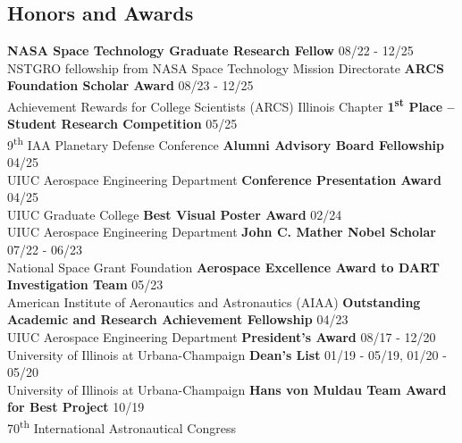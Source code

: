 \documentclass[margin,line]{res}
\newlength{\myitemspacing}
\begin{document}
\begin{resume}
\section{\sc Honors and Awards}
{\bf NASA Space Technology Graduate Research Fellow} \hfill 08/22  - 12/25\\
NSTGRO fellowship from NASA Space Technology Mission Directorate
\vspace{\myitemspacing}\newline
{\bf ARCS Foundation Scholar Award} \hfill 08/23 - 12/25\\
Achievement Rewards for College Scientists (ARCS) Illinois Chapter
\vspace{\myitemspacing}\newline
{\bf 1\textsuperscript{st} Place -- Student Research Competition} \hfill 05/25\\
9\textsuperscript{th} IAA Planetary Defense Conference
\vspace{\myitemspacing}\newline
{\bf Alumni Advisory Board Fellowship} \hfill 04/25\\
UIUC Aerospace Engineering Department
\vspace{\myitemspacing}\newline
{\bf Conference Presentation Award} \hfill 04/25\\
UIUC Graduate College
\vspace{\myitemspacing}\newline
{\bf Best Visual Poster Award} \hfill 02/24\\
UIUC Aerospace Engineering Department
\vspace{\myitemspacing}\newline
{\bf John C. Mather Nobel Scholar} \hfill 07/22 - 06/23\\
National Space Grant Foundation
\vspace{\myitemspacing}\newline
{\bf Aerospace Excellence Award to DART Investigation Team} \hfill 05/23\\
American Institute of Aeronautics and Astronautics (AIAA)
\vspace{\myitemspacing}\newline
{\bf Outstanding Academic and Research Achievement Fellowship} \hfill 04/23\\
UIUC Aerospace Engineering Department
\vspace{\myitemspacing}\newline
{\bf President's Award} \hfill 08/17 - 12/20\\
University of Illinois at Urbana-Champaign
\vspace{\myitemspacing}\newline
{\bf Dean's List} \hfill 01/19 - 05/19, 01/20 - 05/20\\
University of Illinois at Urbana-Champaign
\vspace{\myitemspacing}\newline
{\bf Hans von Muldau Team Award for Best Project} \hfill 10/19\\
70\textsuperscript{th} International Astronautical Congress


\end{resume}
\end{document}
